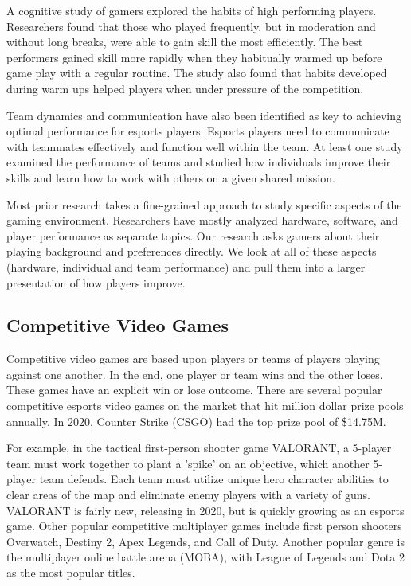 \documentclass[11pt,manuscript,screen,review]{acmart} %
\begin{document}
A cognitive study of gamers explored the habits of high performing players. Researchers found that those who played frequently, but in moderation and without long breaks, were able to gain skill the most efficiently. The best performers gained skill more rapidly when they habitually warmed up before game play with a regular routine. The study also found that habits developed during warm ups helped players when under pressure of the competition. \cite{huang2017}

Team dynamics and communication have also been identified as key to achieving optimal performance for esports players. Esports players need to communicate with teammates effectively and function well within the team. \cite{himmel2017} At least one study examined the performance of teams and studied how individuals improve their skills and learn how to work with others on a given shared mission. \cite{Sapienza2018}

Most prior research takes a fine-grained approach to study specific aspects of the gaming environment. Researchers have mostly analyzed hardware, software, and player performance as separate topics. Our research asks gamers about their playing background and preferences directly. We look at all of these aspects (hardware, individual and team performance) and pull them into a larger presentation of how players improve.

\subsection{Competitive Video Games}
Competitive video games are based upon players or teams of players playing against one another. In the end, one player or team wins and the other loses. These games have an explicit win or lose outcome. There are several popular competitive esports video games on the market that hit million dollar prize pools annually. In 2020, Counter Strike (CSGO) had the top prize pool of \$14.75M. \cite{murray2021} 

For example, in the tactical first-person shooter game VALORANT, a 5-player team must work together to plant a 'spike' on an objective, which another 5-player team defends. Each team must utilize unique hero character abilities to clear areas of the map and eliminate enemy players with a variety of guns. VALORANT is fairly new, releasing in 2020, but is quickly growing as an esports game. Other popular competitive multiplayer games include first person shooters Overwatch, Destiny 2, Apex Legends, and Call of Duty. Another popular genre is the multiplayer online battle arena (MOBA), with League of Legends and Dota 2 as the most popular titles.
\end{document}
